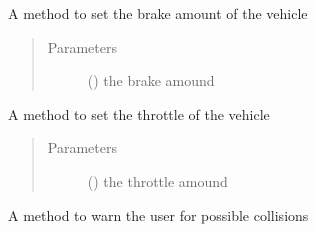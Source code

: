 \documentclass[letterpaper,10pt,english]{sphinxmanual}
\begin{document}
\begin{fulllineitems}
\begin{fulllineitems}
\end{fulllineitems}


\begin{fulllineitems}
\label{\detokenize{driver:lib.driver.CanBus.set_brake}}
A method to set the brake amount of the vehicle
\begin{quote}\begin{description}
\item[{Parameters}] \leavevmode
{} () \textendash{} the brake amound

\end{description}\end{quote}

\end{fulllineitems}


\begin{fulllineitems}
\label{\detokenize{driver:lib.driver.CanBus.set_throttle}}
A method to set the throttle of the vehicle
\begin{quote}\begin{description}
\item[{Parameters}] \leavevmode
{} () \textendash{} the throttle amound

\end{description}\end{quote}

\end{fulllineitems}


\begin{fulllineitems}
\label{\detokenize{driver:lib.driver.CanBus.warn}}
A method to warn the user for possible collisions

\end{fulllineitems}


\end{fulllineitems}
\end{document}

